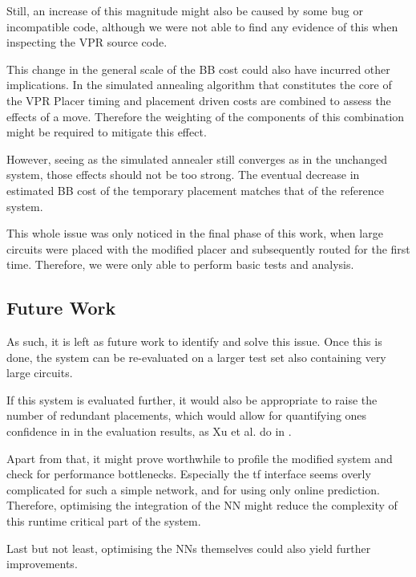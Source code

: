 Still, an increase of this magnitude might also be caused by some bug or incompatible code, although we were not able to find any evidence of this when inspecting the \gls{VPR} source code.

This change in the general scale of the \gls{BB} cost could also have incurred other implications. In the simulated annealing algorithm that constitutes the core of the \gls{VPR} Placer timing and placement driven costs are combined to assess the effects of a move. Therefore the weighting of the components of this combination might be required to mitigate this effect.

However, seeing as the simulated annealer still converges as in the unchanged system, those effects should not be too strong. The eventual decrease in estimated \gls{BB} cost of the temporary placement matches that of the reference system.

This whole issue was only noticed in the final phase of this work, when large circuits were placed with the modified placer and subsequently routed for the first time. Therefore, we were only able to perform basic tests and analysis.

\subsection{Future Work}

As such, it is left as future work to identify and solve this issue. Once this is done, the system can be re-evaluated on a larger test set also containing very large circuits. 

If this system is evaluated further, it would also be appropriate to raise the number of redundant placements, which would allow for quantifying ones confidence in in the evaluation results, as Xu et al. do in \cite{star-plus-paper}.

Apart from that, it might prove worthwhile to profile the modified system and check for performance bottlenecks. Especially the \gls{tf} interface seems overly complicated for such a simple network, and for using only online prediction. Therefore, optimising the integration of the \gls{NN} might reduce the complexity of this runtime critical part of the system.

Last but not least, optimising the \glspl{NN} themselves could also yield further improvements.
